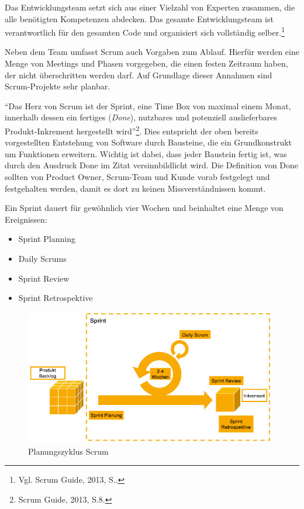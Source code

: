                   Das Entwicklungsteam setzt sich aus einer Vielzahl von Experten zusammen, die alle benötigten Kompetenzen abdecken. Das gesamte Entwicklungsteam ist verantwortlich für den gesamten Code und organisiert sich vollständig selber.\footnote{Vgl. Scrum Guide, 2013, S..}

                  Neben dem Team umfasst Scrum auch Vorgaben zum Ablauf. Hierfür werden eine Menge von Meetings und Phasen vorgegeben, die einen festen Zeitraum haben, der nicht überschritten werden darf. Auf Grundlage dieser Annahmen sind Scrum-Projekte sehr planbar.

                \enquote{Das Herz von Scrum ist der Sprint, eine Time Box von maximal einem Monat, innerhalb dessen ein fertiges (\emph{Done}), nutzbares und potenziell auslieferbares Produkt-Inkrement hergestellt wird}\footnote{Scrum Guide, 2013, S.8.}. Dies entspricht der oben bereits vorgestellten Entstehung von Software durch Bausteine, die ein Grundkonstrukt um Funktionen erweitern. Wichtig ist dabei, dass jeder Baustein fertig ist, was durch den Ausdruck Done im Zitat versinnbildlicht wird. Die Definition von Done sollten von Product Owner, Scrum-Team und Kunde vorab festgelegt und festgehalten werden, damit es dort zu keinen Missverständnissen kommt.

                Ein Sprint dauert für gewöhnlich vier Wochen und beinhaltet eine Menge von Ereignissen:
                  \begin{itemize}
                    \item Sprint Planning
                    \item Daily Scrums
                    \item Sprint Review
                    \item Sprint Retrospektive
                  \end{itemize}

                  \begin{figure}[!htbp]
                        \begin{center}
                        \includegraphics[width=11cm]{Abbildungen/scrum}
                        \caption{Planungszyklus Scrum\protect\footnotemark}
                        \label{abb:scrum}
                        \end{center}
                  \end{figure}


